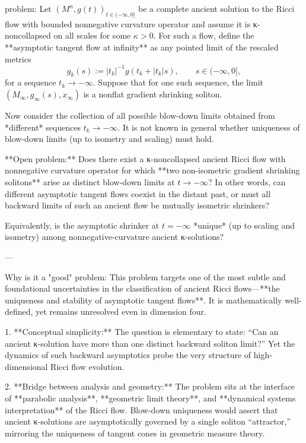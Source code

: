 problem:  
Let \((M^n, g(t))_{t\in(-\infty,0]}\) be a complete ancient solution to the Ricci flow with bounded nonnegative curvature operator and assume it is κ-noncollapsed on all scales for some \(\kappa>0\).  
For such a flow, define the **asymptotic tangent flow at infinity** as any pointed limit of the rescaled metrics  
\[
g_k(s) := |t_k|^{-1} g(t_k + |t_k|s),\qquad s\in(-\infty,0],
\]
for a sequence \(t_k\to-\infty\). Suppose that for one such sequence, the limit \((M_\infty,g_\infty(s),x_\infty)\) is a nonflat gradient shrinking soliton.  

Now consider the collection of all possible blow-down limits obtained from *different* sequences \(t_k\to -\infty\). It is not known in general whether uniqueness of blow-down limits (up to isometry and scaling) must hold.  

**Open problem:**  
Does there exist a κ-noncollapsed ancient Ricci flow with nonnegative curvature operator for which **two non-isometric gradient shrinking solitons** arise as distinct blow-down limits at \(t\to -\infty\)?  
In other words, can different asymptotic tangent flows coexist in the distant past, or must all backward limits of such an ancient flow be mutually isometric shrinkers?  

Equivalently, is the asymptotic shrinker at \(t=-\infty\) *unique* (up to scaling and isometry) among nonnegative-curvature ancient κ-solutions?

---

Why is it a "good" problem:  
This problem targets one of the most subtle and foundational uncertainties in the classification of ancient Ricci flows—**the uniqueness and stability of asymptotic tangent flows**. It is mathematically well-defined, yet remains unresolved even in dimension four.  

1. **Conceptual simplicity:**  
   The question is elementary to state: “Can an ancient κ-solution have more than one distinct backward soliton limit?” Yet the dynamics of such backward asymptotics probe the very structure of high-dimensional Ricci flow evolution.  

2. **Bridge between analysis and geometry:**  
   The problem sits at the interface of **parabolic analysis**, **geometric limit theory**, and **dynamical systems interpretation** of the Ricci flow. Blow-down uniqueness would assert that ancient κ-solutions are asymptotically governed by a single soliton “attractor,” mirroring the uniqueness of tangent cones in geometric measure theory.  

